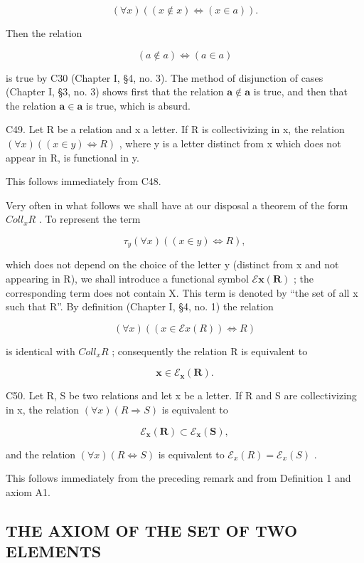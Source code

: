 \[
(\forall x) ((x \notin x) \iff (x \in a)).
\]

Then the relation

\[
(a \notin a) \iff (a \in a)
\]

is true by C30 (Chapter I, §4, no. 3). The method of disjunction of cases (Chapter I, §3, no. 3) shows first that the relation \(\pmb{a} \notin \pmb{a}\) is true, and then that the relation \(\pmb{a} \in \pmb{a}\) is true, which is absurd.

C49. Let R be a relation and x a letter. If R is collectivizing in x, the relation \((\forall x)((x \in y) \Longleftrightarrow R)\) , where y is a letter distinct from x which does not appear in R, is functional in y.

This follows immediately from C48.

Very often in what follows we shall have at our disposal a theorem of the form \(Coll_{x}R\) . To represent the term

\[
\tau_ {y} (\forall x) ((x \in y) \iff R),
\]

which does not depend on the choice of the letter y (distinct from x and not appearing in R), we shall introduce a functional symbol \(\mathcal{E}\mathbf{x}(\mathbf{R})\) ; the corresponding term does not contain X. This term is denoted by ``the set of all x such that R''. By definition (Chapter I, §4, no. 1) the relation

\[
(\forall x) ((x \in \mathcal {E} x (R)) \iff R)
\]

is identical with \(Coll_{x}R\) ; consequently the relation R is equivalent to

\[
\boldsymbol {x} \in \mathcal {E} _ {\boldsymbol {x}} (\boldsymbol {R}).
\]

C50. Let R, S be two relations and let x be a letter. If R and S are collectivizing in x, the relation \((\forall x)(R \Longrightarrow S)\) is equivalent to

\[
\mathcal {E} _ {\boldsymbol {x}} (\boldsymbol {R}) \subset \mathcal {E} _ {\boldsymbol {x}} (\boldsymbol {S}),
\]

and the relation \((\forall x)(R \Longleftrightarrow S)\) is equivalent to \(\mathcal{E}_{x}(R) = \mathcal{E}_{x}(S)\) .

This follows immediately from the preceding remark and from Definition 1 and axiom A1.

\subsection{THE AXIOM OF THE SET OF TWO ELEMENTS}

